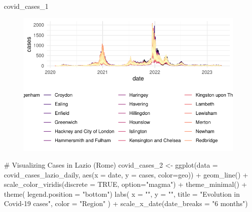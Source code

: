 \documentclass[
  letterpaper,
  DIV=11,
  numbers=noendperiod]{scrreprt}
\newenvironment{Shaded}{\begin{snugshade}}{\end{snugshade}}
\newcommand{\AttributeTok}[1]{\textcolor[rgb]{0.40,0.45,0.13}{#1}}
\newcommand{\CommentTok}[1]{\textcolor[rgb]{0.37,0.37,0.37}{#1}}
\newcommand{\ConstantTok}[1]{\textcolor[rgb]{0.56,0.35,0.01}{#1}}
\newcommand{\FunctionTok}[1]{\textcolor[rgb]{0.28,0.35,0.67}{#1}}
\newcommand{\NormalTok}[1]{\textcolor[rgb]{0.00,0.23,0.31}{#1}}
\newcommand{\OtherTok}[1]{\textcolor[rgb]{0.00,0.23,0.31}{#1}}
\newcommand{\SpecialCharTok}[1]{\textcolor[rgb]{0.37,0.37,0.37}{#1}}
\newcommand{\StringTok}[1]{\textcolor[rgb]{0.13,0.47,0.30}{#1}}
\begin{document}
\begin{Shaded}
\begin{Highlighting}[]
\NormalTok{  covid\_cases\_1}
\end{Highlighting}
\end{Shaded}

\begin{figure}[H]

{\centering \includegraphics{longitudinal-2_files/figure-pdf/unnamed-chunk-7-1.pdf}

}

\end{figure}

\begin{Shaded}
\begin{Highlighting}[]
\CommentTok{\# Visualizing Cases in Lazio (Rome)}
\NormalTok{covid\_cases\_2 }\OtherTok{\textless{}{-}} \FunctionTok{ggplot}\NormalTok{(}\AttributeTok{data =}\NormalTok{ covid\_cases\_lazio\_daily, }\FunctionTok{aes}\NormalTok{(}\AttributeTok{x =}\NormalTok{ date, }\AttributeTok{y =}\NormalTok{ cases, }\AttributeTok{color=}\NormalTok{geo)) }\SpecialCharTok{+}
  \FunctionTok{geom\_line}\NormalTok{() }\SpecialCharTok{+} 
  \FunctionTok{scale\_color\_viridis}\NormalTok{(}\AttributeTok{discrete =} \ConstantTok{TRUE}\NormalTok{, }\AttributeTok{option=}\StringTok{"magma"}\NormalTok{) }\SpecialCharTok{+}
  \FunctionTok{theme\_minimal}\NormalTok{() }\SpecialCharTok{+}
  \FunctionTok{theme}\NormalTok{(}
    \AttributeTok{legend.position =} \StringTok{"bottom"}\NormalTok{)}
  \FunctionTok{labs}\NormalTok{(}
    \AttributeTok{x =} \StringTok{""}\NormalTok{,}
    \AttributeTok{y =} \StringTok{""}\NormalTok{,}
    \AttributeTok{title =} \StringTok{"Evolution in Covid{-}19 cases"}\NormalTok{,}
    \AttributeTok{color =} \StringTok{"Region"}
\NormalTok{  ) }\SpecialCharTok{+}
  \FunctionTok{scale\_x\_date}\NormalTok{(}\AttributeTok{date\_breaks =} \StringTok{"6 months"}\NormalTok{)}
\end{Highlighting}
\end{Shaded}
\end{document}

